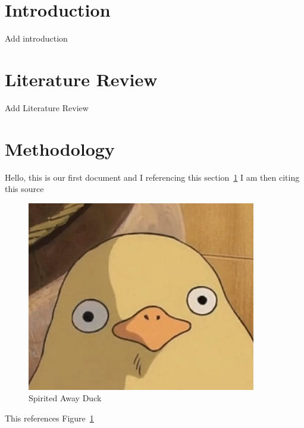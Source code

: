 \documentclass[11pt, A4]{report}
\begin{document}
    \section{Introduction}\label{sec:introduction}

    Add introduction


    \section{Literature Review}\label{sec:literature review}

    Add Literature Review

    \section{Methodology}\label{sec:methodology}

    Hello, this is our first document and I referencing this section~\ref{sec:introduction}
    I am then citing this source~\cite{ani2019victory}

    \begin{figure}
        \centering
        \includegraphics[width=10cm]{figures/SpiritedAwayDuck3}
        \caption{Spirited Away Duck}
        \label{fig:SpiritedAwayDuck}
    \end{figure}


    This references Figure~\ref{fig:SpiritedAwayDuck}

    
    
\end{document}
